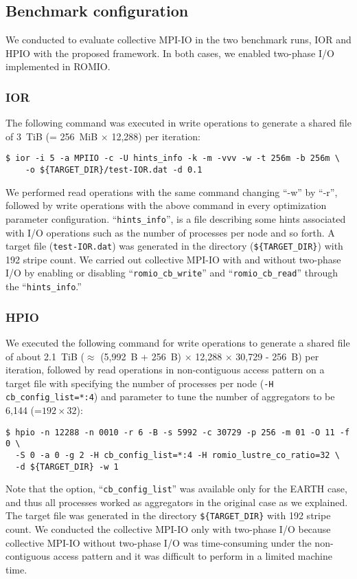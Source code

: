 \documentclass{jhps}
\begin{document}
\subsection{Benchmark configuration}

We conducted to evaluate collective MPI-IO in the two benchmark runs, IOR and HPIO
with the proposed framework.
In both cases, we enabled two-phase I/O implemented in ROMIO.

\subsubsection{IOR}
\label{ssec:IOR_CONFIG}

The following command was executed in write operations to generate
a shared file of 3~TiB (= 256~MiB $\times$ 12,288) per iteration:
%
\begin{verbatim}
$ ior -i 5 -a MPIIO -c -U hints_info -k -m -vvv -w -t 256m -b 256m \
    -o ${TARGET_DIR}/test-IOR.dat -d 0.1
\end{verbatim}
%
We performed read operations with the same command changing ``-w'' by ``-r'',
followed by write operations with the above command
in every optimization parameter configuration.
``{\tt hints\_info}'', is a file describing some hints associated with
I/O operations such as the number of processes per node and so forth.
A target file ({\tt test-IOR.dat}) was generated in the directory
({\tt \$\{TARGET\_DIR\}}) with 192 stripe count.
We carried out collective MPI-IO with and without two-phase I/O by enabling
or disabling ``{\tt romio\_cb\_write}'' and ``{\tt romio\_cb\_read}''
through the ``{\tt hints\_info}.''
%

\subsubsection{HPIO}
\label{ssec:HPIO_CONFIG}

We executed the following command for write operations to generate
a shared file of about 2.1~TiB ($\approx$ (5,992~B + 256~B) $\times$ 12,288 $\times$ 30,729 - 256~B)
per iteration, followed by read operations in non-contiguous access pattern
on a target file with specifying the number of processes per node ({\tt -H cb\_config\_list=*:4}) and parameter to tune the number of aggregators to be
6,144 (=$192 \times 32$):
%
\begin{verbatim}
$ hpio -n 12288 -n 0010 -r 6 -B -s 5992 -c 30729 -p 256 -m 01 -O 11 -f 0 \
  -S 0 -a 0 -g 2 -H cb_config_list=*:4 -H romio_lustre_co_ratio=32 \
  -d ${TARGET_DIR} -w 1
\end{verbatim}
%
Note that the option, ``{\tt cb\_config\_list}'' was available only for
the EARTH case, and thus all processes worked as aggregators
in the original case as we explained.
The target file was generated in the directory {\tt \$\{TARGET\_DIR\}}
with 192 stripe count. We conducted the collective MPI-IO
only with two-phase I/O because collective MPI-IO without two-phase I/O was
time-consuming under the non-contiguous access pattern and
it was difficult to perform in a limited machine time.
\end{document}
